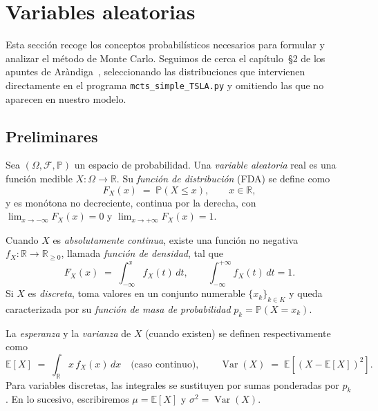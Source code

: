 \section{Variables aleatorias}
\label{sec:variables-aleatorias}

Esta sección recoge los conceptos probabilísticos necesarios para formular y analizar el método de Monte Carlo. Seguimos de cerca el capítulo~\S2 de los apuntes de Aràndiga~\cite{arandiga}, seleccionando las distribuciones que intervienen directamente en el programa \texttt{mcts\_simple\_TSLA.py} y omitiendo las que no aparecen en nuestro modelo.

\subsection{Preliminares}
\label{subsec:preliminares-va}

Sea $(\Omega, \mathcal{F}, \mathbb{P})$ un espacio de probabilidad. Una \emph{variable aleatoria} real es una función medible $X: \Omega \to \mathbb{R}$. Su \emph{función de distribución} (FDA) se define como
\[
    F_X(x) \;=\; \mathbb{P}(X \leq x), \qquad x \in \mathbb{R},
\]
y es monótona no decreciente, continua por la derecha, con $\lim_{x\to -\infty} F_X(x) = 0$ y $\lim_{x\to +\infty} F_X(x) = 1$.

Cuando $X$ es \emph{absolutamente continua}, existe una función no negativa $f_X: \mathbb{R} \to \mathbb{R}_{\geq 0}$, llamada \emph{función de densidad}, tal que
\[
    F_X(x) \;=\; \int_{-\infty}^{x} f_X(t)\, dt, \qquad \int_{-\infty}^{+\infty} f_X(t)\, dt = 1.
\]
Si $X$ es \emph{discreta}, toma valores en un conjunto numerable $\{x_k\}_{k\in K}$ y queda caracterizada por su \emph{función de masa de probabilidad} $p_k = \mathbb{P}(X = x_k)$.

La \emph{esperanza} y la \emph{varianza} de $X$ (cuando existen) se definen respectivamente como
\[
    \mathbb{E}[X] \;=\; \int_{\mathbb{R}} x\, f_X(x)\, dx \quad \text{(caso continuo)},
    \qquad
    \operatorname{Var}(X) \;=\; \mathbb{E}\!\left[(X - \mathbb{E}[X])^2\right].
\]
Para variables discretas, las integrales se sustituyen por sumas ponderadas por $p_k$. En lo sucesivo, escribiremos $\mu = \mathbb{E}[X]$ y $\sigma^2 = \operatorname{Var}(X)$.

